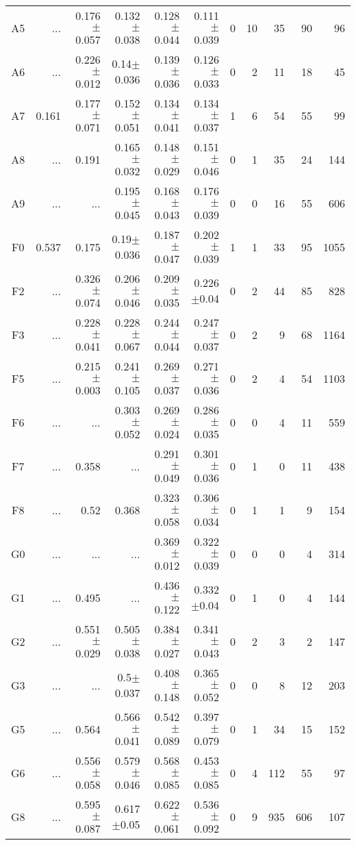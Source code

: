 \begin{table}[t]
\begin{center}
\begin{tabular}{c|rrrrr|rrrrr}
A5	&	 ...	&	0.176$\pm$0.057	&	0.132$\pm$0.038	&	0.128$\pm$0.044	&	0.111$\pm$0.039	&	0	&	10	&	35	&	90	&	96	\\
A6	&	 ...	&	0.226$\pm$0.012	&	0.14$\pm$0.036	&	0.139$\pm$0.036	&	0.126$\pm$0.033	&	0	&	2	&	11	&	18	&	45	\\
A7	&	0.161	&	0.177$\pm$0.071	&	0.152$\pm$0.051	&	0.134$\pm$0.041	&	0.134$\pm$0.037	&	1	&	6	&	54	&	55	&	99	\\
A8	&	 ...	&	0.191	&	0.165$\pm$0.032	&	0.148$\pm$0.029	&	0.151$\pm$0.046	&	0	&	1	&	35	&	24	&	144	\\
A9	&	 ...	&	 ...	&	0.195$\pm$0.045	&	0.168$\pm$0.043	&	0.176$\pm$0.039	&	0	&	0	&	16	&	55	&	606	\\
F0	&	0.537	&	0.175	&	0.19$\pm$0.036	&	0.187$\pm$0.047	&	0.202$\pm$0.039	&	1	&	1	&	33	&	95	&	1055	\\
F2	&	 ...	&	0.326$\pm$0.074	&	0.206$\pm$0.046	&	0.209$\pm$0.035	&	0.226$\pm$0.04	&	0	&	2	&	44	&	85	&	828	\\
F3	&	 ...	&	0.228$\pm$0.041	&	0.228$\pm$0.067	&	0.244$\pm$0.044	&	0.247$\pm$0.037	&	0	&	2	&	9	&	68	&	1164	\\
F5	&	 ...	&	0.215$\pm$0.003	&	0.241$\pm$0.105	&	0.269$\pm$0.037	&	0.271$\pm$0.036	&	0	&	2	&	4	&	54	&	1103	\\
F6	&	 ...	&	 ...	&	0.303$\pm$0.052	&	0.269$\pm$0.024	&	0.286$\pm$0.035	&	0	&	0	&	4	&	11	&	559	\\
F7	&	 ...	&	0.358	&	 ...	&	0.291$\pm$0.049	&	0.301$\pm$0.036	&	0	&	1	&	0	&	11	&	438	\\
F8	&	 ...	&	0.52	&	0.368	&	0.323$\pm$0.058	&	0.306$\pm$0.034	&	0	&	1	&	1	&	9	&	154	\\
G0	&	 ...	&	 ...	&	 ...	&	0.369$\pm$0.012	&	0.322$\pm$0.039	&	0	&	0	&	0	&	4	&	314	\\
G1	&	 ...	&	0.495	&	 ...	&	0.436$\pm$0.122	&	0.332$\pm$0.04	&	0	&	1	&	0	&	4	&	144	\\
G2	&	 ...	&	0.551$\pm$0.029	&	0.505$\pm$0.038	&	0.384$\pm$0.027	&	0.341$\pm$0.043	&	0	&	2	&	3	&	2	&	147	\\
G3	&	 ...	&	 ...	&	0.5$\pm$0.037	&	0.408$\pm$0.148	&	0.365$\pm$0.052	&	0	&	0	&	8	&	12	&	203	\\
G5	&	 ...	&	0.564	&	0.566$\pm$0.041	&	0.542$\pm$0.089	&	0.397$\pm$0.079	&	0	&	1	&	34	&	15	&	152	\\
G6	&	 ...	&	0.556$\pm$0.058	&	0.579$\pm$0.046	&	0.568$\pm$0.085	&	0.453$\pm$0.085	&	0	&	4	&	112	&	55	&	97	\\
G8	&	 ...	&	0.595$\pm$0.087	&	0.617$\pm$0.05	&	0.622$\pm$0.061	&	0.536$\pm$0.092	&	0	&	9	&	935	&	606	&	107	\\

\end{tabular}
\end{center}
\end{table}
